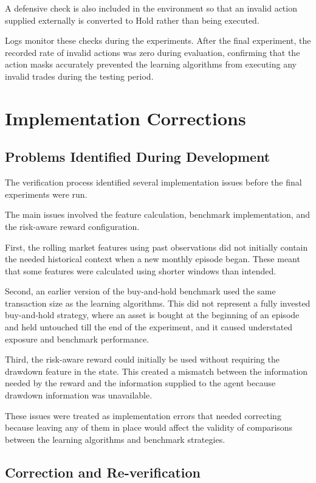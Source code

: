 A defensive check is also included in the environment so that an invalid
action supplied externally is converted to Hold rather than being
executed.

Logs monitor these checks during the experiments. After the final
experiment, the recorded rate of invalid actions was zero during
evaluation, confirming that the action masks accurately prevented the
learning algorithms from executing any invalid trades during the testing
period.

\section{Implementation Corrections}

\subsection{Problems Identified During Development}

The verification process identified several implementation issues before
the final experiments were run.

The main issues involved the feature calculation, benchmark
implementation, and the risk-aware reward configuration.

First, the rolling market features using past observations did not
initially contain the needed historical context when a new monthly
episode began. These meant that some features were calculated using
shorter windows than intended.

Second, an earlier version of the buy-and-hold benchmark used the same
transaction size as the learning algorithms. This did not represent a
fully invested buy-and-hold strategy, where an asset is bought at the
beginning of an episode and held untouched till the end of the
experiment, and it caused understated exposure and benchmark
performance.

Third, the risk-aware reward could initially be used without requiring
the drawdown feature in the state. This created a mismatch between the
information needed by the reward and the information supplied to the
agent because drawdown information was unavailable.

These issues were treated as implementation errors that needed
correcting because leaving any of them in place would affect the
validity of comparisons between the learning algorithms and benchmark
strategies.

\subsection{Correction and Re-verification}

